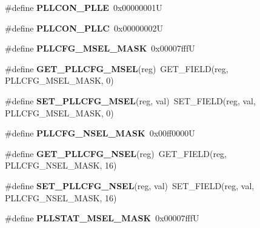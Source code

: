 \begin{DoxyCompactItemize}
\#define {\bfseries P\+L\+L\+C\+O\+N\+\_\+\+P\+L\+LE}~0x00000001U
\item 
\mbox{\label{group__lpc24xx__regs_gab8e86539f007286c2ab01348c588e147}} 
\#define {\bfseries P\+L\+L\+C\+O\+N\+\_\+\+P\+L\+LC}~0x00000002U
\item 
\mbox{\label{group__lpc24xx__regs_ga24209c71fe1f6c6c4f09b6cd90359364}} 
\#define {\bfseries P\+L\+L\+C\+F\+G\+\_\+\+M\+S\+E\+L\+\_\+\+M\+A\+SK}~0x00007fffU
\item 
\mbox{\label{group__lpc24xx__regs_gae33192b32651b69995657d57883b9420}} 
\#define {\bfseries G\+E\+T\+\_\+\+P\+L\+L\+C\+F\+G\+\_\+\+M\+S\+EL}(reg)~G\+E\+T\+\_\+\+F\+I\+E\+LD(reg, P\+L\+L\+C\+F\+G\+\_\+\+M\+S\+E\+L\+\_\+\+M\+A\+SK, 0)
\item 
\mbox{\label{group__lpc24xx__regs_gab65a6bfe1c1afc2bac311974bb6bdc6b}} 
\#define {\bfseries S\+E\+T\+\_\+\+P\+L\+L\+C\+F\+G\+\_\+\+M\+S\+EL}(reg,  val)~S\+E\+T\+\_\+\+F\+I\+E\+LD(reg, val, P\+L\+L\+C\+F\+G\+\_\+\+M\+S\+E\+L\+\_\+\+M\+A\+SK, 0)
\item 
\mbox{\label{group__lpc24xx__regs_ga5d5fc2d1efcc377d9c25c6bfd554564f}} 
\#define {\bfseries P\+L\+L\+C\+F\+G\+\_\+\+N\+S\+E\+L\+\_\+\+M\+A\+SK}~0x00ff0000U
\item 
\mbox{\label{group__lpc24xx__regs_gaa928f55144c046904e035995d59601e0}} 
\#define {\bfseries G\+E\+T\+\_\+\+P\+L\+L\+C\+F\+G\+\_\+\+N\+S\+EL}(reg)~G\+E\+T\+\_\+\+F\+I\+E\+LD(reg, P\+L\+L\+C\+F\+G\+\_\+\+N\+S\+E\+L\+\_\+\+M\+A\+SK, 16)
\item 
\mbox{\label{group__lpc24xx__regs_gad0963b9350b00c321a40d20b9586da53}} 
\#define {\bfseries S\+E\+T\+\_\+\+P\+L\+L\+C\+F\+G\+\_\+\+N\+S\+EL}(reg,  val)~S\+E\+T\+\_\+\+F\+I\+E\+LD(reg, val, P\+L\+L\+C\+F\+G\+\_\+\+N\+S\+E\+L\+\_\+\+M\+A\+SK, 16)
\item 
\mbox{\label{group__lpc24xx__regs_ga4e7fa7370fa65a84bcbc014916d3b22a}} 
\#define {\bfseries P\+L\+L\+S\+T\+A\+T\+\_\+\+M\+S\+E\+L\+\_\+\+M\+A\+SK}~0x00007fffU
\item 

\end{DoxyCompactItemize}
